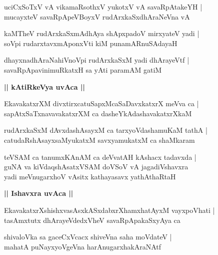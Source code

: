\documentclass[twoside,12pt,openright]{book}
\newcounter{shloka}[chapter]
\def\uvaca#1{\centerline{{\large\textbf{#1}}}}
\begin{document}
\begin{shloka}%
uciCxSoTxV vA vikamaRsothxV yukotxV vA savaRpAtakeYH |\\
mucayxteV savaRpApeVBoyxV rudArxkaSxdhAraNeVna vA
\end{shloka}

\begin{shloka}%
kaMTheV rudArxkaSxmAdhAya shApxpadoV mirxyateV yadi |\\
soVpi rudarxtavxmAponxVti kiM punamARnuSAdayaH 
\end{shloka}

\begin{shloka}%
dhayxnadhAraNahiVnoVpi rudArxkaSxM yadi dhArayeVtf |\\
savaRpApavinimuRkatxH sa yAti paramAM gatiM
\end{shloka}

\uvaca{|| kAtiRkeVya uvAca ||}

\begin{shloka}%
EkavakatxrXM divxtirxcatuSapxMcaSaDavxkatxrX meVva ca |\\
sapAtxSaTxnavavakatxrXM ca dasheYkAdashavakatxrXkaM 
\end{shloka}

\begin{shloka}%
rudArxkaSxM dAvxdashAsayxM ca tarxyoVdashamuKaM tathA |\\
catudaRshAsayxsaMyukatxM savxyamukatxM ca shaMkaram 
\end{shloka}

\begin{shloka}%
teVSAM ca tanumxKAnAM ca deVvatAH kAshacx tadavxda |\\
guNA va kiVdaqshAsatxVSAM doVSoV vA jagadiVshavxra \\
yadi meVnugarxhoV vAsitx kathayasavx yathAthaRtaH 
\end{shloka}

\uvaca{|| Ishavxra uvAca ||}

\begin{shloka}%
EkavakatxrXshishxvasAsxkASxdabxrXhamxhatAyxM vayxpoVhati |\\
tasAmxtutx dhArayeVdedxVheV savaRpApakaSxyAya ca 
\end{shloka}

\begin{shloka}%
shivaloVka sa gaceCxVcacx shiveVna saha moVdateV |\\
mahatA puNayxyoVgeVna harAnugarxhakAraNAtf
\end{shloka}
\end{document}
